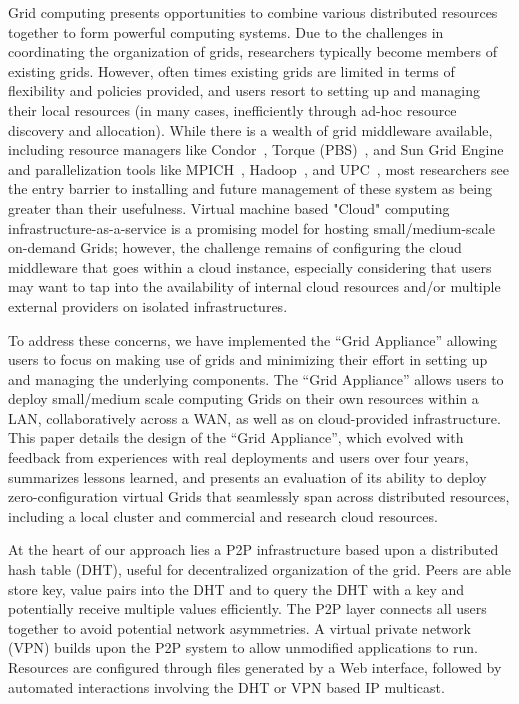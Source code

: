\documentclass[conference]{IEEEtran}
\begin{document}
Grid computing presents opportunities to combine various distributed resources
together to form powerful computing systems.  Due to the challenges in
coordinating the organization of grids, researchers typically become members of
existing grids. However, often times existing grids are limited in terms of
flexibility and policies provided, and users resort to setting up and managing
their local resources (in many cases, inefficiently through ad-hoc resource
discovery and allocation).  While there is a wealth of grid middleware
available, including resource managers like Condor~\cite{condor0}, Torque
(PBS)~\cite{torque}, and Sun Grid Engine~\cite{grid_engine} and parallelization
tools like MPICH~\cite{mpich}, Hadoop~\cite{hadoop}, and UPC~\cite{upc}, most
researchers see the entry barrier to installing and future management of these
system as being greater than their usefulness.  Virtual machine based "Cloud"
computing infrastructure-as-a-service is a promising model for hosting
small/medium-scale on-demand Grids; however, the challenge remains of
configuring the cloud middleware that goes within a cloud instance, especially
considering that users may want to tap into the availability of internal cloud
resources and/or multiple external providers on isolated infrastructures. 


To address these concerns, we have implemented the ``Grid Appliance'' allowing
users to focus on making use of grids and minimizing their effort in setting up
and managing the underlying components.  The ``Grid Appliance'' allows users to
deploy small/medium scale computing Grids on their own resources within a LAN,
collaboratively across a WAN, as well as on cloud-provided infrastructure. This
paper details the design of the ``Grid Appliance'', which evolved with feedback
from experiences with real deployments and users over four years, summarizes
lessons learned, and presents an evaluation of its ability to deploy
zero-configuration virtual Grids that seamlessly span across distributed
resources, including a local cluster and commercial and research cloud
resources.

At the heart of our approach lies a P2P infrastructure based upon a distributed
hash table (DHT), useful for decentralized organization of the grid.  Peers are
able store key, value pairs into the DHT and to query the DHT with a key and
potentially receive multiple values efficiently.  The P2P layer connects all
users together to avoid potential network asymmetries.  A virtual private
network (VPN) builds upon the P2P system to allow unmodified applications to
run.  Resources are configured through files generated by a Web interface,
followed by automated interactions involving the DHT or VPN based IP multicast.  
\end{document}
